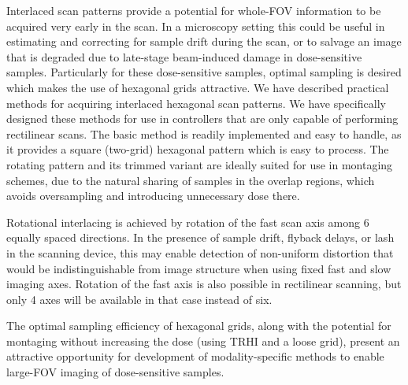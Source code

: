 \documentclass{article}
\begin{document}
Interlaced scan patterns provide a potential for whole-FOV information to be acquired very early in the scan.
%
In a microscopy setting this could be useful in estimating and correcting for sample drift during the scan, or to salvage an image that is degraded due to late-stage beam-induced damage in dose-sensitive samples.
%
Particularly for these dose-sensitive samples, optimal sampling is desired which makes the use of hexagonal grids attractive.
%
We have described practical methods for acquiring interlaced hexagonal scan patterns.
%
We have specifically designed these methods for use in controllers that are only
capable of performing rectilinear scans.
%
The basic method is readily implemented and easy to handle, as it provides a square (two-grid) hexagonal pattern which is easy to process.
%
The rotating pattern and its trimmed variant are ideally suited for use in montaging schemes, due to the natural sharing of samples in the overlap regions, which avoids oversampling and introducing unnecessary dose there.
%


Rotational interlacing is achieved by rotation of the fast scan axis among 6
equally spaced directions.
%
In the presence of sample drift, flyback delays, or lash in the scanning device,
this may enable detection of non-uniform distortion that would be
indistinguishable from image structure when using fixed fast and slow imaging
axes.
%
Rotation of the fast axis is also possible in rectilinear scanning, but only 4
axes will be available in that case instead of six.


The optimal sampling efficiency of hexagonal grids, along with the potential for
montaging without increasing the dose (using TRHI and a loose grid), present an
attractive opportunity for development of modality-specific methods to enable
large-FOV imaging of dose-sensitive samples.



\end{document}
